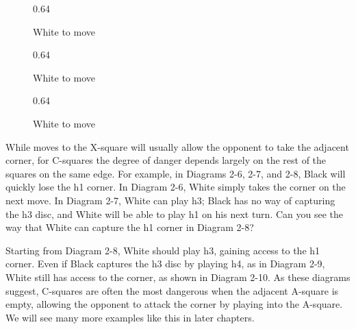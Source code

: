 \documentclass[a4paper,12pt]{book}
\newcommand{\scalefactorthreeup}{0.64}
\begin{document}
\begin{figure}[h]
\begin{center}
\begin{minipage}[t]{.32\textwidth}
\begin{othelloboard}{\scalefactorthreeup}
\dotmarkings
{}
\end{othelloboard}
\caption{White to move}
\end{minipage}
\hfill
\begin{minipage}[t]{.32\textwidth}
\begin{othelloboard}{\scalefactorthreeup}
\dotmarkings
{}
\end{othelloboard}
\caption{White to move}
\end{minipage}
\hfill
\begin{minipage}[t]{.32\textwidth}
\begin{othelloboard}{\scalefactorthreeup}
\dotmarkings
{}
\end{othelloboard}
\caption{White to move}
\end{minipage}
\end{center}
\end{figure}

While moves to the X-square will usually allow the opponent to take the adjacent
corner, for C-squares the degree of danger depends largely on the rest of the
squares on the same edge. For example, in Diagrams 2-6, 2-7, and 2-8, Black will
quickly lose the h1 corner. In Diagram 2-6, White simply takes the corner on the next
move. In Diagram 2-7, White can play h3; Black has no way of capturing the h3 disc,
and White will be able to play h1 on his next turn. Can you see the way that White can capture the h1 corner in Diagram 2-8?

Starting from Diagram 2-8, White should play h3, gaining access to the h1 corner.
Even if Black captures the h3 disc by playing h4, as in Diagram 2-9, White still
has access to the corner, as shown in Diagram 2-10. As these diagrams suggest, C-squares are often the most dangerous when the adjacent A-square is empty, allowing
the opponent to attack the corner by playing into the A-square. We will see many
more examples like this in later chapters.
\end{document}
